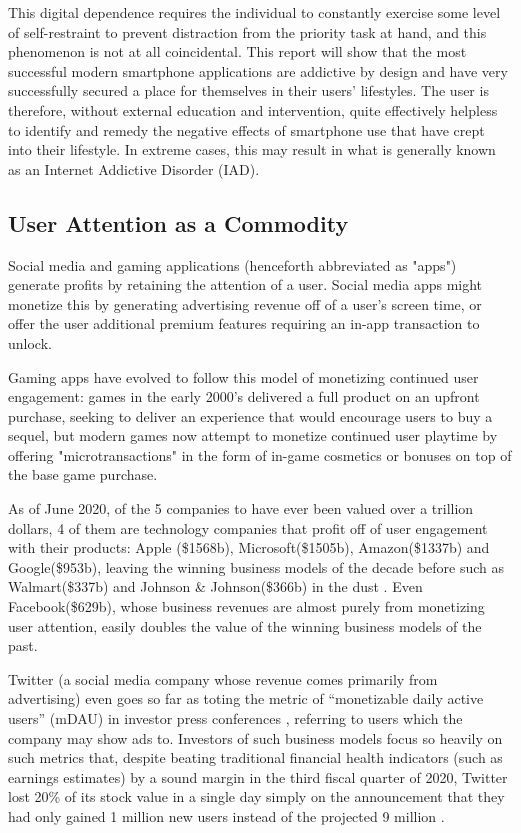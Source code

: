 This digital dependence requires the individual to constantly exercise some level of self-restraint to prevent distraction from the priority task at hand, and this phenomenon is not at all coincidental. This report will show that the most successful modern smartphone applications are addictive by design and have very successfully secured a place for themselves in their users' lifestyles. The user is therefore, without external education and intervention, quite effectively helpless to identify and remedy the negative effects of smartphone use that have crept into their lifestyle. In extreme cases, this may result in what is generally known as an Internet Addictive Disorder (IAD).

\subsection{User Attention as a Commodity}
Social media and gaming applications (henceforth abbreviated as "apps") generate profits by retaining the attention of a user. Social media apps might monetize this by generating advertising revenue off of a user's screen time, or offer the user additional premium features requiring an in-app transaction to unlock.

Gaming apps have evolved to follow this model of monetizing continued user engagement: games in the early 2000's delivered a full product on an upfront purchase, seeking to deliver an experience that would encourage users to buy a sequel, but modern games now attempt to monetize continued user playtime by offering "microtransactions" in the form of in-game cosmetics or bonuses on top of the base game purchase.

As of June 2020, of the 5 companies to have ever been valued over a trillion dollars, 4 of them are technology companies that profit off of user engagement with their products: Apple (\$1568b), Microsoft(\$1505b), Amazon(\$1337b) and Google(\$953b), leaving the winning business models of the decade before such as Walmart(\$337b) and Johnson \& Johnson(\$366b) in the dust \cite{pwctop100}. Even Facebook(\$629b), whose business revenues are almost purely from monetizing user attention, easily doubles the value of the winning business models of the past.

Twitter (a social media company whose revenue comes primarily from advertising) even goes so far as toting the metric of ``monetizable daily active users'' (mDAU) in investor press conferences \cite{twtrTranscript}, referring to users which the company may show ads to. Investors of such business models focus so heavily on such metrics that, despite beating traditional financial health indicators (such as earnings estimates) by a sound margin in the third fiscal quarter of 2020, Twitter lost 20\% of its stock value in a single day simply on the announcement that they had only gained 1 million new users instead of the projected 9 million \cite{twtrLoss} \cite{twtrTranscript}.

